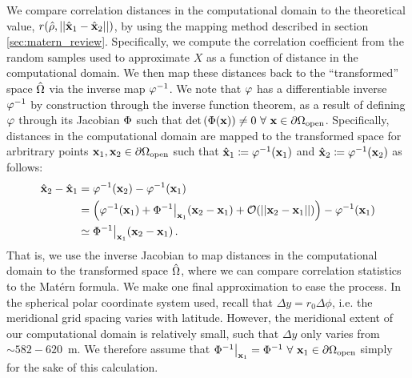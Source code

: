 We compare correlation distances in the computational domain to the
theoretical value, $r(\hat{\rho},||\hat{\mathbf{x}}_1-\hat{\mathbf{x}}_2||)$, by using the mapping method described in
section \ref{sec:matern_review}.
Specifically, we compute the correlation coefficient from the random samples
used to approximate $X$ as a function of distance in the computational domain.
We then map these distances back to the ``transformed'' space $\hat{\Omega}$ via
the inverse map $\varphi^{-1}$.
We note that $\varphi$ has a differentiable inverse $\varphi^{-1}$ by construction
through the inverse function theorem,
as a result of defining $\varphi$ through its Jacobian $\Phi$ such that
$\text{det}\left(\Phi(\mathbf{x})\right) \neq 0 \,\,\forall \,\,\mathbf{x}\in\partial\Omega_{\text{open}}$.
Specifically, distances in the computational domain are mapped to the
transformed space for arbritrary points $\mathbf{x}_1,\mathbf{x}_2\in\partial\Omega_{\text{open}}$ such that
$\hat{\mathbf{x}}_1\coloneqq\varphi^{-1}(\mathbf{x}_1)$ and $\hat{\mathbf{x}}_2\coloneqq \varphi^{-1}(\mathbf{x}_2)$ as
follows:
\begin{equation*}
    \begin{aligned}
        \hat{\mathbf{x}}_2 - \hat{\mathbf{x}}_1 &= \varphi^{-1}(\mathbf{x}_2) - \varphi^{-1}(\mathbf{x}_1) \\
                      &= \left(
                            \varphi^{-1}(\mathbf{x}_1) +
                            \Phi^{-1}\big|_{\mathbf{x}_{1}}(\mathbf{x}_2-\mathbf{x}_1) +
                            \mathcal{O}( ||\mathbf{x}_2-\mathbf{x}_1|| )
                        \right) - \varphi^{-1}(\mathbf{x}_1) \\
                        &\simeq \Phi^{-1}\big|_{\mathbf{x}_{1}}(\mathbf{x}_2-\mathbf{x}_1) \, .
    \end{aligned}
    \label{eq:matern_correlation_iso}
\end{equation*}
That is, we use the inverse Jacobian to map distances in the computational domain to the
transformed space $\hat{\Omega}$, where we can compare correlation statistics to
the Mat\'ern formula.
We make one final approximation to ease the process.
In the spherical polar coordinate system used, recall that
$\Delta y = r_0 \Delta \phi$, i.e. the meridional grid spacing varies with
latitude.
However, the meridional extent of our computational domain is relatively small,
such that $\Delta y$ only varies from $\sim 582-620$~m.
We therefore assume that
$\Phi^{-1}\big|_{\mathbf{x}_{1}} =\Phi^{-1}\,\,\forall\,\,\mathbf{x}_1\in\partial\Omega_{\text{open}}$
simply for the sake of this calculation.

